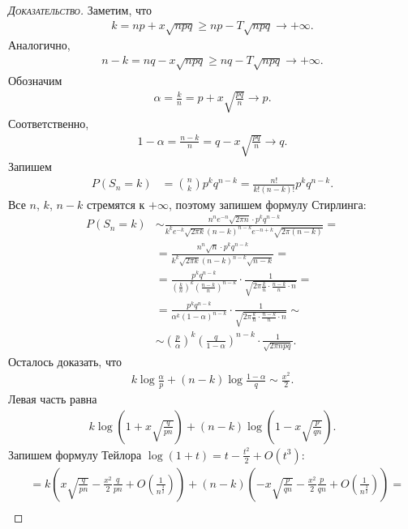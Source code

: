 \documentclass[../main.tex]{subfiles}
\begin{document}
\begin{proof}[\normalfont\textsc{Доказательство}]
 Заметим, что
 \begin{align*}
  k = np + x \sqrt{npq} \geqslant np - T \sqrt{npq} \to +\infty.
 \end{align*} Аналогично,
 \begin{align*}
  n - k = nq - x \sqrt{npq} \geqslant nq - T \sqrt{npq} \to +\infty
 .\end{align*} Обозначим
 \begin{align*}
  \alpha = \frac{k}{n} = p + x\sqrt{\frac{pq}{n}} \to p
 .\end{align*} Соответственно,
 \begin{align*}
  1 - \alpha = \frac{n - k}{n} = q - x \sqrt{\frac{pq}{n}} \to q.
 \end{align*} Запишем
 \begin{align*}
  P(S_n = k) &= \binom n k p^{k}q^{n-k} = \frac{n!}{k!(n-k)!} p^{k}q^{n-k}.
 \end{align*} Все $n$, $k$, $n - k$ стремятся к  $+\infty$, поэтому запишем формулу Стирлинга:
 \begin{align*}
  P(S_n = k) &\sim \frac{n^{n}e^{-n}\sqrt{2\pi n} \cdot p^{k}q^{n-k}}{k^{k}e^{-k}\sqrt{2\pi k}(n-k)^{n-k}e^{-n+k}\sqrt{2\pi (n-k)}} = \\
  &= \frac{n^{n}\sqrt{n} \cdot p^{k}q^{n-k}}{k^{k}\sqrt{2\pi k}(n-k)^{n-k} \sqrt{n-k}} = \\
  &= \frac{p^{k}q^{n-k}}{(\frac{k}{n})^{k}(\frac{n-k}{n})^{n-k}} \cdot \frac{1}{\sqrt{2 \pi \frac{k}{n} \cdot \frac{n-k}{n} \cdot n}} = \\
  &= \frac{p^{k}q^{n-k}}{\alpha^{k}(1 - \alpha)^{n-k}} \cdot \frac{1}{\sqrt{2 \pi \frac{k}{n} \cdot \frac{n-k}{n} \cdot n}} \sim \\
  &\sim \left(\frac{p}{\alpha}\right)^{k} \left( \frac{q}{1 - \alpha} \right)^{n-k} \cdot \frac{1}{\sqrt{2 \pi npq}}
 .\end{align*} Осталось доказать, что
 \begin{align*}
  k \log \frac{\alpha}{p} + (n-k) \log \frac{1 - \alpha}{q} \sim \frac{x^{2}}{2}
 .\end{align*} Левая часть равна
 \begin{align*}
  k \log\left(1 + x \sqrt{\frac{q}{pn}}\right) + (n-k)\log \left( 1 - x \sqrt{\frac{p}{qn}} \right).
 \end{align*} Запишем формулу Тейлора $\log(1 + t) = t - \frac{t^{2}}{2} + O(t^{3})$:
 \begin{align*}
  &= k \left(x \sqrt{\frac{q}{pn}} - \frac{x^{2}}{2} \frac{q}{pn} + O\left(\frac{1}{n^{\frac{3}{2}}}\right)\right) + (n-k) \left( -x \sqrt{\frac{p}{qn}}  - \frac{x^{2}}{2} \frac{p}{qn} + O \left( \frac{1}{n^{\frac{3}{2}}} \right) \right) = \\

\end{align*}
\end{proof}
\end{document}

